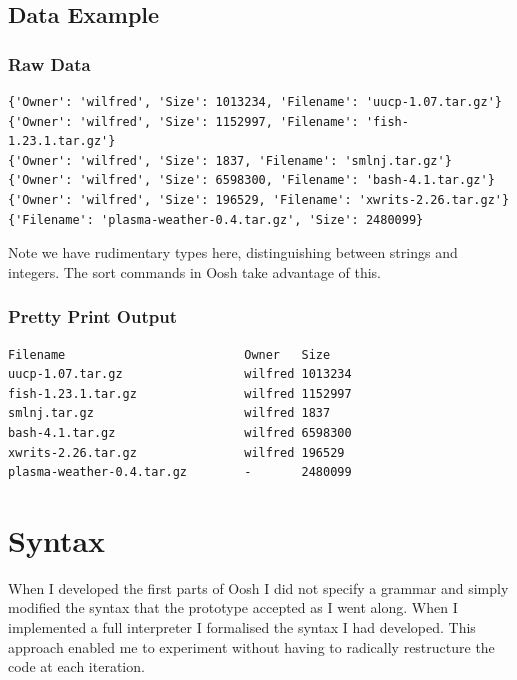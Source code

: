 \documentclass[12pt,twoside,notitlepage]{report}
\begin{document}


\subsection{Data Example}
\subsubsection{Raw Data}
\label{rawdata}
\begin{verbatim}
{'Owner': 'wilfred', 'Size': 1013234, 'Filename': 'uucp-1.07.tar.gz'}
{'Owner': 'wilfred', 'Size': 1152997, 'Filename': 'fish-1.23.1.tar.gz'}
{'Owner': 'wilfred', 'Size': 1837, 'Filename': 'smlnj.tar.gz'}
{'Owner': 'wilfred', 'Size': 6598300, 'Filename': 'bash-4.1.tar.gz'}
{'Owner': 'wilfred', 'Size': 196529, 'Filename': 'xwrits-2.26.tar.gz'}
{'Filename': 'plasma-weather-0.4.tar.gz', 'Size': 2480099}
\end{verbatim}
Note we have rudimentary types here, distinguishing between strings and
integers. The sort commands in Oosh take advantage of this.

\subsubsection{Pretty Print Output}
\begin{verbatim}
Filename                         Owner   Size      
uucp-1.07.tar.gz                 wilfred 1013234   
fish-1.23.1.tar.gz               wilfred 1152997   
smlnj.tar.gz                     wilfred 1837      
bash-4.1.tar.gz                  wilfred 6598300   
xwrits-2.26.tar.gz               wilfred 196529    
plasma-weather-0.4.tar.gz        -       2480099
\end{verbatim}

\section{Syntax}
When I developed the first parts of Oosh I did not specify a grammar and simply
modified the syntax that the prototype accepted as I went along. When I
implemented a full interpreter I formalised the syntax I had developed. This
approach enabled me to experiment without having to radically restructure the
code at each iteration.
\end{document}
